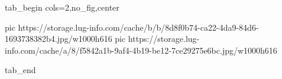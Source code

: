  
 
 
 
 

\ifcmt
  tab_begin cols=2,no_fig,center

     pic https://storage.lug-info.com/cache/b/b/8d8f0b74-ca22-4da9-84d6-1693738382b4.jpg/w1000h616
		 pic https://storage.lug-info.com/cache/a/8/f5842a1b-9af4-4b19-be12-7ce29275e6bc.jpg/w1000h616

  tab_end
\fi
